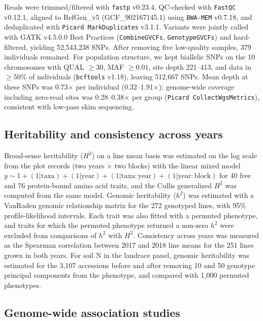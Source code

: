 \documentclass[namedate,unnumsec,webpdf,contemporary,large]{oup-authoring-template}
\begin{document}
Reads were trimmed/filtered with \texttt{fastp} v0.23.4, QC-checked with \texttt{FastQC} v0.12.1, aligned to RefGen\_v5 (GCF\_902167145.1) using \texttt{BWA-MEM} v0.7.18, and deduplicated with \texttt{Picard MarkDuplicates} v3.1.1. Variants were jointly called with GATK v4.5.0.0 Best Practices (\texttt{CombineGVCFs}, \texttt{GenotypeGVCFs}) and hard-filtered, yielding 52,543,238 SNPs. After removing five low-quality samples, 379 individuals remained. For population structure, we kept biallelic SNPs on the 10 chromosomes with QUAL $\ge 30$, MAF $\ge 0.01$, site depth 221--413, and data in $\ge$50\% of individuals (\texttt{bcftools} v1.18), leaving 512,667 SNPs. Mean depth at these SNPs was 0.73$\times$ per individual (0.32--1.91$\times$); genome-wide coverage including zero-read sites was 0.28--0.38$\times$ per group (\texttt{Picard CollectWgsMetrics}), consistent with low-pass skim sequencing.

\subsection{Heritability and consistency across years}
Broad-sense heritability ($H^2$) on a line mean basis was estimated on the log scale from the plot records (two years $\times$ two blocks) with the linear mixed model $y \sim 1 + (1|\mathrm{taxa}) + (1|\mathrm{year}) + (1|\mathrm{taxa{:}year}) + (1|\mathrm{year{:}block})$ for 40 free and 76 protein-bound amino acid traits, and the Cullis generalized $H^2$ was computed from the same model. Genomic heritability ($h^2$) was estimated with a VanRaden genomic relationship matrix for the 272 genotyped lines, with 95\% profile-likelihood intervals. Each trait was also fitted with a permuted phenotype, and traits for which the permuted phenotype returned a non-zero $h^2$ were excluded from comparisons of $h^2$ with $H^2$. Consistency across years was measured as the Spearman correlation between 2017 and 2018 line means for the 251 lines grown in both years. For soil N in the landrace panel, genomic heritability was estimated for the 3,107 accessions before and after removing 10 and 50 genotype principal components from the phenotype, and compared with 1,000 permuted phenotypes.

\subsection{Genome-wide association studies}
\end{document}

